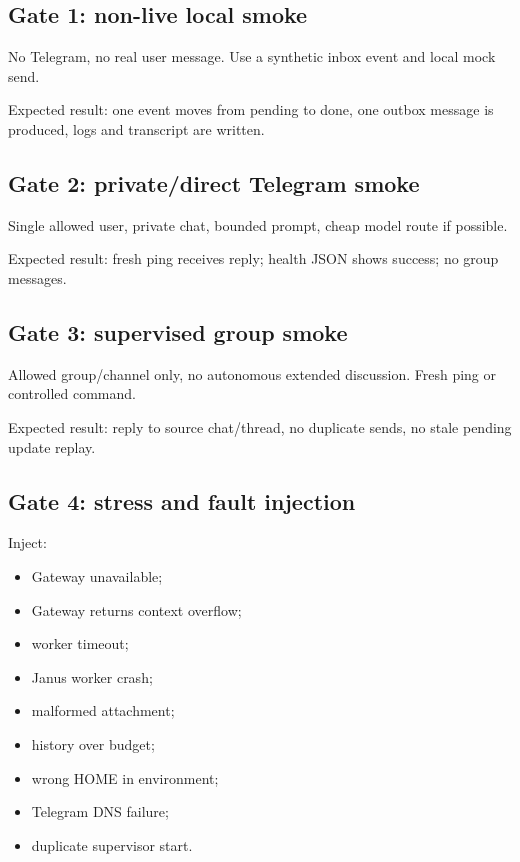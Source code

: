 \documentclass[11pt]{article}
\begin{document}
\subsection{Gate 1: non-live local smoke}

No Telegram, no real user message. Use a synthetic inbox event and local mock send.

Expected result: one event moves from pending to done, one outbox message is produced, logs and transcript are written.

\subsection{Gate 2: private/direct Telegram smoke}

Single allowed user, private chat, bounded prompt, cheap model route if possible.

Expected result: fresh ping receives reply; health JSON shows success; no group messages.

\subsection{Gate 3: supervised group smoke}

Allowed group/channel only, no autonomous extended discussion. Fresh ping or controlled command.

Expected result: reply to source chat/thread, no duplicate sends, no stale pending update replay.

\subsection{Gate 4: stress and fault injection}

Inject:

\begin{itemize}
  \item Gateway unavailable;
  \item Gateway returns context overflow;
  \item worker timeout;
  \item Janus worker crash;
  \item malformed attachment;
  \item history over budget;
  \item wrong HOME in environment;
  \item Telegram DNS failure;
  \item duplicate supervisor start.
\end{itemize}
\end{document}
